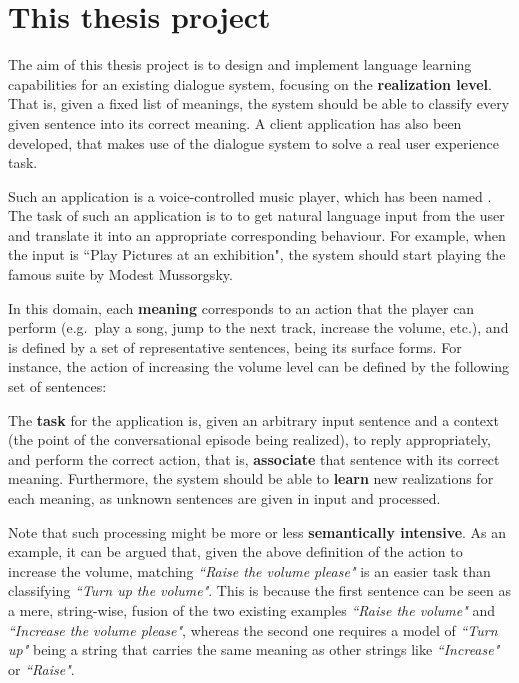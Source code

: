 
\section{This thesis project} \label{ch:intro:project}

The aim of this thesis project is to design and implement language learning capabilities for an existing dialogue system, focusing on the \textbf{realization level}. That is, given a fixed list of meanings, the system should be able to classify every given sentence into its correct meaning. A client application has also been developed, that makes use of the dialogue system to solve a real user experience task.

Such an application is a voice-controlled music player, which has been named \textbf{\pname}. The task of such an application is to to get natural language input from the user and translate it into an appropriate corresponding behaviour. For example, when the input is ``Play Pictures at an exhibition", the system should start playing the famous suite by Modest Mussorgsky.

In this domain, each \textbf{meaning} corresponds to an action that the player can perform (e.g.\ play a song, jump to the next track, increase the volume, etc.), and is defined by a set of representative sentences, being its surface forms. For instance, the action of increasing the volume level can be defined by the following set of sentences:

The \textbf{task} for the application is, given an arbitrary input sentence and a context (the point of the conversational episode being realized), to reply appropriately, and perform the correct action, that is, \textbf{associate} that sentence with its correct meaning. Furthermore, the system should be able to \textbf{learn} new realizations for each meaning, as unknown sentences are given in input and processed.

Note that such processing might be more or less \textbf{semantically intensive}. As an example, it can be argued that, given the above definition of the action to increase the volume, matching \textit{``Raise the volume please"} is an easier task than classifying \textit{``Turn up the volume"}. This is because the first sentence can be seen as a mere, string-wise, fusion of the two existing examples \textit{``Raise the volume"} and \textit{``Increase the volume please"}, whereas the second one requires a model of \textit{``Turn up"} being a string that carries the same meaning as other strings like \textit{``Increase"} or \textit{``Raise"}.

